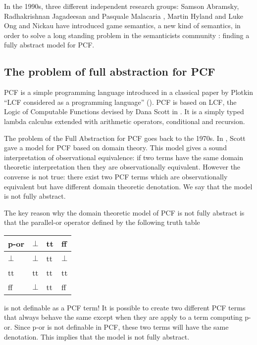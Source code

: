 In the 1990s, three different independent research groups: Samson
Abramsky, Radhakrishnan Jagadeesan and Pasquale Malacaria
\citep{abramsky94full}, Martin Hyland and Luke Ong
\citep{hylandong_pcf} and Nickau \citep{Nickau:lfcs94} have
introduced game semantics, a new kind of semantics, in order to
solve a long standing problem in the semanticists community :
finding a fully abstract model for PCF.

\subsection{The problem of full abstraction for PCF}

PCF is a simple programming language introduced in a classical paper
by Plotkin ``LCF considered as a programming language''
(\cite{DBLP:journals/tcs/Plotkin77}). PCF is based on LCF, the Logic
of Computable Functions devised by Dana Scott in \cite{scott_lcf}.
It is a simply typed lambda calculus extended with arithmetic
operators, conditional and recursion.

The problem of the Full Abstraction for PCF goes back to the 1970s.
In \citep{scott93}, Scott gave a model for PCF based on domain
theory. This model gives a sound interpretation of observational
equivalence: if two terms have the same domain theoretic
interpretation then they are observationally equivalent. However the
converse is not true: there exist two PCF terms which are
observationally equivalent but have different domain theoretic
denotation. We say that the model is not fully abstract.

The key reason why the domain theoretic model of PCF is not fully
abstract is that the parallel-or operator defined by the following
truth table
\begin{center}
\begin{tabular}{l|lll}
p-or  & $\bot$ & tt & ff \\ \hline
$\bot$ & $\bot$ & tt & $\bot$\\
tt & tt & tt & tt\\
ff & $\bot$ & tt & ff\\
\end{tabular}
\end{center}
is not definable as a PCF term! It is possible to create two
different PCF terms that always behave the same except when they are
apply to a term computing p-or. Since p-or is not definable in PCF,
these two terms will have the same denotation. This implies that the
model is not fully abstract.

